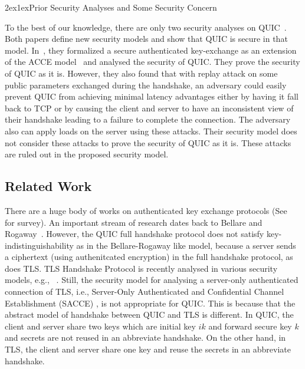 \documentclass[11pt,a4j]{jarticle}
\makeatletter
\renewcommand{\section}{\@startsection{section}{1}{\z@}%
{2ex}{1ex}{\reset@font\large\bfseries}}%
\makeatother
\begin{document}
\section{Prior Security Analyses and Some Security Concern}

To the best of our knowledge, there are only two security analyses on QUIC~\cite{FG14:QUIC,LJBN15:QUIC}.
Both papers define new security models and show that QUIC is secure in that model.
In~\cite{LJBN15:QUIC}, they formalized a secure authenticated key-exchange
as an extension of the ACCE model~\cite{JKSS12:ACCE} and analysed
the security of QUIC.
They prove the security of QUIC as it is.
However, they also found that with replay attack on some public parameters exchanged during the handshake, an adversary could easily prevent QUIC from achieving minimal latency advantages either by having it fall back to TCP or by causing the client and server to have an inconsistent view of their handshake leading to a failure to complete the connection.
The adversary also can apply loads on the server using these attacks.
Their security model does not consider these attacks to prove the security of QUIC as it is.
These attacks are ruled out in the proposed security model.

\subsection{Related Work} \label{sec:Related Work}
There are a huge body of works on authenticated key exchange protocols
(See~\cite{CK01:AKE} for survey).
An important stream of research dates back to Bellare and Rogaway~\cite{BR93:AKE}.
However,
the QUIC full handshake protocol does not satisfy key-indistinguishability as in the Bellare-Rogaway like model, because a server sends a ciphertext (using authenitcated encryption) in the full handshake protocol, as does TLS.
TLS Handshake Protocol is recently analysed in various security models, e.g., ~\cite{JKSS12:ACCE,KPW13:SACCE,FS13:ACCE,BFKPSB14:TLS}.
Still,
the security model for analysing a server-only authenticated connection of TLS,
i.e., Server-Only Authenticated and Confidential Channel Establishment (SACCE) \cite{KPW13:SACCE}, is not appropriate for QUIC.
This is because that the abstract model of handshake between QUIC and TLS is different.
In QUIC, the client and server share two keys which are initial key $ik$ and forward secure key $k$ and
secrets are not reused in an abbreviate handshake.
On the other hand, in TLS, the client and server share one key and reuse the secrets in an abbreviate handshake.
\end{document}
